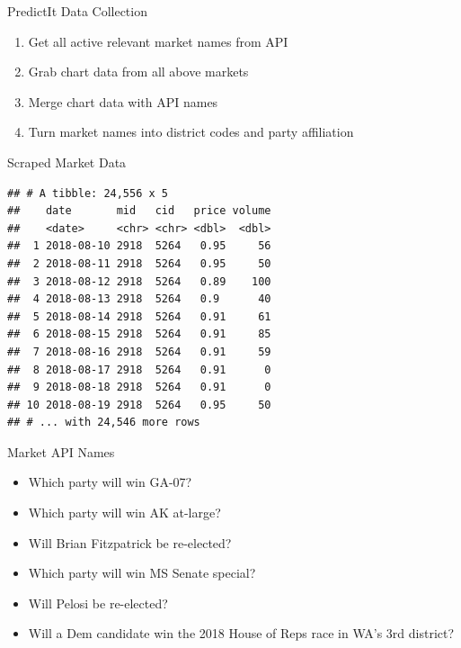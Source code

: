 \documentclass[ignorenonframetext,]{beamer}
\providecommand{\tightlist}{%
  \setlength{\itemsep}{0pt}\setlength{\parskip}{0pt}}
\begin{document}
\begin{frame}{PredictIt Data Collection}

\begin{enumerate}
\def\labelenumi{\arabic{enumi}.}
\tightlist
\item
  Get all active relevant market names from API
\item
  Grab chart data from all above markets
\item
  Merge chart data with API names
\item
  Turn market names into district codes and party affiliation
\end{enumerate}

\end{frame}

\begin{frame}[fragile]{Scraped Market Data}

\begin{verbatim}
## # A tibble: 24,556 x 5
##    date       mid   cid   price volume
##    <date>     <chr> <chr> <dbl>  <dbl>
##  1 2018-08-10 2918  5264   0.95     56
##  2 2018-08-11 2918  5264   0.95     50
##  3 2018-08-12 2918  5264   0.89    100
##  4 2018-08-13 2918  5264   0.9      40
##  5 2018-08-14 2918  5264   0.91     61
##  6 2018-08-15 2918  5264   0.91     85
##  7 2018-08-16 2918  5264   0.91     59
##  8 2018-08-17 2918  5264   0.91      0
##  9 2018-08-18 2918  5264   0.91      0
## 10 2018-08-19 2918  5264   0.95     50
## # ... with 24,546 more rows
\end{verbatim}

\end{frame}

\begin{frame}{Market API Names}

\begin{itemize}
\tightlist
\item
  Which party will win GA-07?
\item
  Which party will win AK at-large?
\item
  Will Brian Fitzpatrick be re-elected?
\item
  Which party will win MS Senate special?
\item
  Will Pelosi be re-elected?
\item
  Will a Dem candidate win the 2018 House of Reps race in WA's 3rd
  district?
\end{itemize}

\end{frame}
\end{document}
